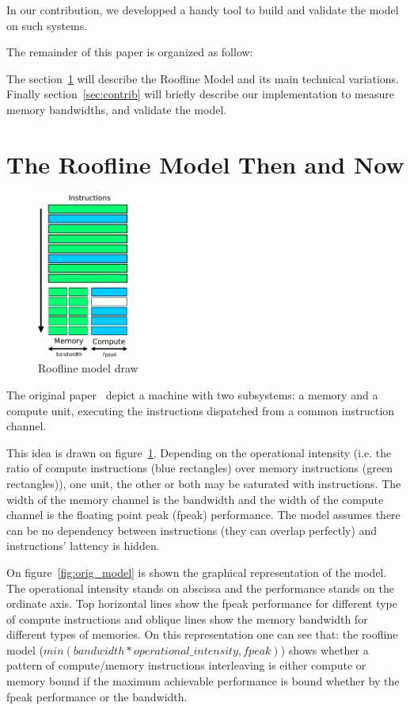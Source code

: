 \documentclass[twoside,twocolumn,8pt]{extarticle}
\begin{document}
In our contribution, we developped a handy tool to build and validate the model on such systems.

The remainder of this paper is organized as follow:

The section~\ref{sec:state_of_art} will describe the Roofline Model and its main technical variations.
Finally section~\ref{sec:contrib} will briefly describe our implementation to measure memory bandwidths, and validate the model.

\section{The Roofline Model Then and Now}\label{sec:state_of_art}
\begin{figure}
  \centering
  \includegraphics[width=30mm]{pictures/model_drawing}
  \caption{Roofline model draw}
  \label{fig:roofline_draw}
\end{figure}

The original paper~\cite{Williams:2009:RIV:1498765.1498785} depict a machine with two subsystems: a memory and a compute unit,
executing the instructions dispatched from a common instruction channel.

This idea is drawn on figure~\ref{fig:roofline_draw}.
Depending on the operational intensity (i.e. the ratio of compute instructions (blue rectangles) over memory instructions (green rectangles)),
one unit, the other or both may be saturated with instructions. The width of the memory channel is the bandwidth and the width
of the compute channel is the floating point peak (fpeak) performance. The model assumes there can be no dependency between
instructions (they can overlap perfectly) and instructions' lattency is hidden.

On figure~\ref{fig:orig_model} is shown the graphical representation of the model.
The operational intensity stands on abscissa and the performance stands on the ordinate axis.
Top horizontal lines show the fpeak performance for different type of compute instructions and
oblique lines show the memory bandwidth for different types of memories. On this representation
one can see that: the roofline model ($min(bandwidth*operational\_intensity, fpeak)$) shows whether a pattern of compute/memory
instructions interleaving is either compute or memory bound if the maximum achievable performance is bound whether by the fpeak
performance or the bandwidth.
\end{document}
